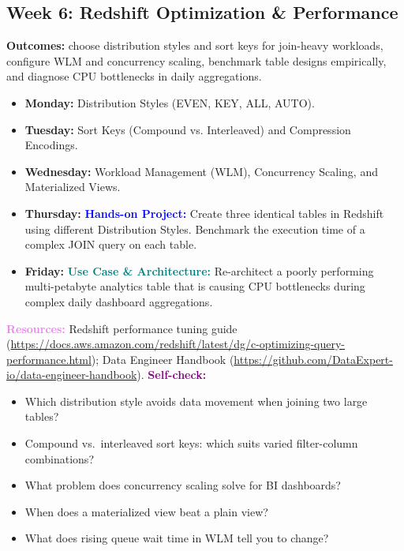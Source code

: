 \documentclass[11pt, a4paper]{article}
\newcommand{\project}[1]{\vspace{1mm}\noindent\textbf{\textcolor{blue}{Hands-on Project:}} #1}
\newcommand{\usecase}[1]{\vspace{1mm}\noindent\textbf{\textcolor{teal}{Use Case \& Architecture:}} #1}
\newcommand{\dayitem}[2]{\item \textbf{#1:} #2}
\newcommand{\resources}[1]{\vspace{1mm}\noindent\textbf{\textcolor{violet}{Resources:}} #1}
\newcommand{\selfcheck}[1]{\vspace{1mm}\noindent\textbf{\textcolor{purple}{Self-check:}} #1}
\begin{document}
\subsection*{Week 6: Redshift Optimization \& Performance}
\par\noindent\textbf{Outcomes:} choose distribution styles and sort keys for join-heavy workloads, configure WLM and concurrency scaling, benchmark table designs empirically, and diagnose CPU bottlenecks in daily aggregations.
\begin{itemize}[label=-]
    \dayitem{Monday}{Distribution Styles (EVEN, KEY, ALL, AUTO).}
    \dayitem{Tuesday}{Sort Keys (Compound vs. Interleaved) and Compression Encodings.}
    \dayitem{Wednesday}{Workload Management (WLM), Concurrency Scaling, and Materialized Views.}
    \dayitem{Thursday}{\project{Create three identical tables in Redshift using different Distribution Styles. Benchmark the execution time of a complex JOIN query on each table.}}
    \dayitem{Friday}{\usecase{Re-architect a poorly performing multi-petabyte analytics table that is causing CPU bottlenecks during complex daily dashboard aggregations.}}
\end{itemize}
\resources{Redshift performance tuning guide (\url{https://docs.aws.amazon.com/redshift/latest/dg/c-optimizing-query-performance.html}); Data Engineer Handbook (\url{https://github.com/DataExpert-io/data-engineer-handbook}).}
\selfcheck{\begin{itemize}[label=-, leftmargin=1.5em, itemsep=0pt]
    \item Which distribution style avoids data movement when joining two large tables?
    \item Compound vs.\ interleaved sort keys: which suits varied filter-column combinations?
    \item What problem does concurrency scaling solve for BI dashboards?
    \item When does a materialized view beat a plain view?
    \item What does rising queue wait time in WLM tell you to change?
\end{itemize}}
\end{document}
